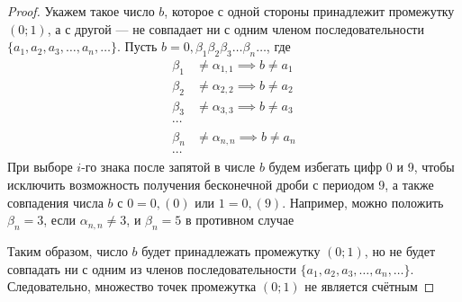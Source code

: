 \documentclass[a4paper,12pt]{article}
\theoremstyle{definition}
\theoremstyle{plain}
\theoremstyle{remark}
\begin{document}
\begin{proof}
		\medskip
		Укажем такое число $b$, которое с одной стороны принадлежит промежутку $(0; 1)$, а с другой — не совпадает ни с одним членом последовательности $\{a_1, a_2, a_3, \dots, a_n, \dots\}$.
		Пусть $b = 0, \beta_1 \beta_2 \beta_3 \dots \beta_n \dots$, где
		\begin{align*}
			\beta_1 &\neq \alpha_{1,1} \implies b \neq a_1 \\
			\beta_2 &\neq \alpha_{2,2} \implies b \neq a_2 \\
			\beta_3 &\neq \alpha_{3,3} \implies b \neq a_3 \\
			\cdots & \\
			\beta_n &\neq \alpha_{n,n} \implies b \neq a_n \\
			\cdots & 
		\end{align*}
		При выборе $i$-го знака после запятой в числе $b$ будем избегать цифр 0 и 9, чтобы исключить возможность получения бесконечной дроби с периодом 9, а также совпадения числа $b$ с $0 = 0,(0)$ или $1 = 0,(9)$. Например, можно положить $\beta_n = 3$, если $\alpha_{n,n} \neq 3$, и $\beta_n = 5$ в противном случае
	
		\medskip
		Таким образом, число $b$ будет принадлежать промежутку $(0; 1)$, но не будет совпадать ни с одним из членов последовательности $\{a_1, a_2, a_3, \dots, a_n, \dots\}$.
		Следовательно, множество точек промежутка $(0; 1)$ не является счётным
	\end{proof}
	
\end{document}
